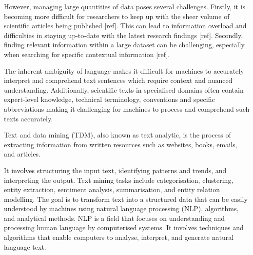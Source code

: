 \documentclass[12pt, a4paper]{report}
\begin{document}



However, managing large quantities of data poses several challenges. 
Firstly, it is becoming more difficult for researchers to keep up with the sheer volume of scientific articles being published [ref]. 
This can lead to information overload and difficulties in staying up-to-date with the latest research findings [ref]. Secondly, finding relevant information within a large dataset can be challenging, especially when searching for specific contextual information [ref].

The inherent ambiguity of language makes it difficult for machines to accurately interpret and comprehend text sentences which require context and nuanced understanding. 
Additionally, scientific texts in specialised domains often contain expert-level knowledge, technical terminology, conventions and specific abbreviations making it challenging for machines to process and comprehend such texts accurately. 


Text and data mining (TDM), also known as text analytic, is the process of extracting information from written resources such as websites, books, emails, and articles.

It involves structuring the input text, identifying patterns and trends, and interpreting the output. Text mining tasks include categorisation, clustering, entity extraction, sentiment analysis, summarisation, and entity relation modelling. The goal is to transform text into a structured data that can be easily understood by machines using natural language processing (NLP), algorithms, and analytical methods.
NLP is a field that focuses on understanding and processing human language by computerised systems. It involves techniques and algorithms that enable computers to analyse, interpret, and generate natural language text.
\end{document}
